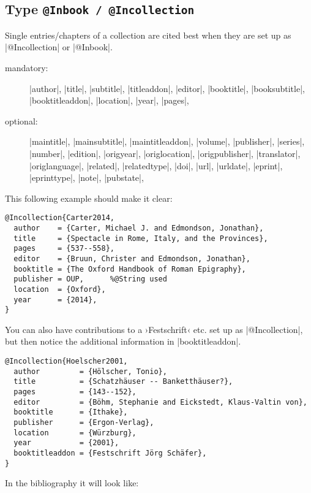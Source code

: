\documentclass[a4paper,
10pt,
greek,
french,
spanish,
italian,
ngerman,
english
]{ltxdoc}
\begin{document}
 \subsection{Type \texttt{@Inbook / @Incollection}}\label{inbook}
Single entries/chapters of a collection are cited best when they are set up as  |@Incollection| or |@Inbook|.

\begin{description}
\item[mandatory:] 
|author|, |title|, |subtitle|, |titleaddon|,
|editor|,  |booktitle|, |booksubtitle|, |booktitleaddon|,
|location|, |year|, |pages|, 
\item[optional:]
|maintitle|, |mainsubtitle|, |maintitleaddon|, |volume|, 
|publisher|, |series|, |number|, |edition|, 
|origyear|, |origlocation|, |origpublisher|, 
|translator|, |origlanguage|,
|related|, |relatedtype|,
|doi|, |url|, |urldate|, |eprint|, |eprinttype|, |note|, |pubstate|, 
 \end{description}
 
 
 
This following example should make it clear:
 \begin{lstlisting}[style=bibentry,label=Carter2014,caption={{@}Incollection\{Carter2014,…\} }]
@Incollection{Carter2014,
  author    = {Carter, Michael J. and Edmondson, Jonathan},
  title     = {Spectacle in Rome, Italy, and the Provinces},
  pages     = {537--558},
  editor    = {Bruun, Christer and Edmondson, Jonathan},
  booktitle = {The Oxford Handbook of Roman Epigraphy},
  publisher = OUP,		%@String used
  location  = {Oxford},
  year      = {2014},
}
\end{lstlisting}


You can also have contributions to a ›Festschrift‹ etc. set up as |@Incollection|,
but then notice the additional information in |booktitleaddon|.
\begin{lstlisting}[style=bibentry,label=Hoelscher2001,caption={{@}Incollection\{Hoelscher2001,…\} }]
@Incollection{Hoelscher2001,
  author         = {Hölscher, Tonio},
  title          = {Schatzhäuser -- Banketthäuser?},
  pages          = {143--152},
  editor         = {Böhm, Stephanie and Eickstedt, Klaus-Valtin von},
  booktitle      = {Ithake},
  publisher      = {Ergon-Verlag},
  location       = {Würzburg},
  year           = {2001},
  booktitleaddon = {Festschrift Jörg Schäfer},
}
\end{lstlisting}
In the bibliography it will look like:
\end{document}
